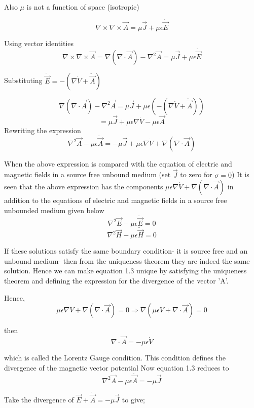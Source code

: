 Also $\mu$ is not a function of space (isotropic)

$$\nabla\times\nabla\times\vec{A}=\mu\vec{J}+\mu\epsilon\dot{\vec{E}}$$ 

Using vector identities
$$\nabla\times\nabla\times\vec{A}= \nabla(\nabla\cdot\vec{A}) -\nabla^{2}\vec{A}=\mu\vec{J}+\mu\epsilon\dot{\vec{E}}$$

Substituting $\dot{\vec{E}}=-(\nabla\dot{V}+\ddot{\vec{A}})$

$$\nabla(\nabla\cdot\vec{A}) -\nabla^{2}\vec{A}=\mu\vec{J}+\mu\epsilon(-(\nabla\dot{V}+\ddot{\vec{A}}))$$
$$=\mu\vec{J}+\mu\epsilon\nabla\dot{V}-\mu\epsilon\vec{A}$$ 
Rewriting the expression
\begin{equation}
\nabla^{2}\vec{A}-\mu\epsilon\ddot{\vec{A}}=-\mu\vec{J}+\mu\epsilon\nabla\dot{V}+\nabla(\nabla\cdot\vec{A})
\end{equation}


When the above expression is compared with the equation of electric and magnetic fields in a source free unbound medium (set $\vec{J}$ to zero for $\sigma=0$) It is seen that the above expression has the components $\mu\epsilon\nabla\dot{V}+\nabla(\nabla\cdot\vec{A})$ in addition to the equations of electric and magnetic fields in a source free unbounded medium given below
$$\nabla^{2}\vec{E}-\mu\epsilon\ddot{\vec{E}}=0$$
$$\nabla^{2}\vec{H}-\mu\epsilon\ddot{\vec{H}}=0$$


If these solutions satisfy the same boundary condition- it is source free and an unbound medium- then from the uniqueness theorem they are indeed the same solution. Hence we can make equation 1.3 unique by satisfying the uniqueness theorem and defining the expression for the divergence of the vector 'A'.

Hence, \begin{equation}
\mu\epsilon\nabla\dot{V}+\nabla(\nabla\cdot\vec{A})=0 \Rightarrow \nabla(\mu\epsilon\dot{V}+\nabla\cdot\vec{A})=0
\end{equation}

then
$$\nabla\cdot\vec{A}=-\mu\epsilon\dot{V}$$

which is called the Lorentz Gauge condition.
This condition defines the divergence of the magnetic vector potential
Now equation 1.3 reduces to
\begin{equation}
\nabla^{2}\vec{A}-\mu\epsilon\ddot{\vec{A}}=-\mu\vec{J}
\end{equation} 


Take the divergence of $\vec{E}+\dot{\vec{A}}=-\mu\vec{J}$ to give;

